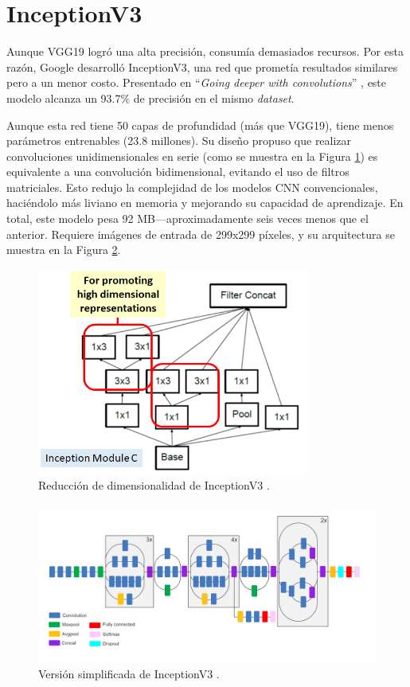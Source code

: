 \section{InceptionV3} \label{sec:inceptionV3}
Aunque VGG19 logró una alta precisión, consumía demasiados
recursos. Por esta razón, Google desarrolló InceptionV3, una
red que prometía resultados similares pero a un menor costo.
Presentado en ``\textit{Going deeper with convolutions}''
\cite{Szegedy2014}, este modelo alcanza un 93.7\% de precisión
en el mismo \textit{dataset}.\

Aunque esta red tiene 50 capas de profundidad (más que VGG19),
tiene menos parámetros entrenables (23.8 millones). Su diseño
propuso que realizar convoluciones unidimensionales en serie
(como se muestra en la Figura \ref{InceptionLayer}) es
equivalente a una convolución bidimensional, evitando el uso
de filtros matriciales. Esto redujo la complejidad de los
modelos CNN convencionales, haciéndolo más liviano en memoria
y mejorando su capacidad de aprendizaje. En total, este modelo
pesa 92 MB—aproximadamente seis veces menos que el anterior.
Requiere imágenes de entrada de 299x299 píxeles, y su
arquitectura se muestra en la Figura \ref{Inceptionv3}.


\begin{figure}[h!] 
    \includegraphics[width=0.8\textwidth]{images/InceptionLayer.png} 
    \centering 
    \caption{Reducción de dimensionalidad de InceptionV3 \protect\cite{modelos}.} 
    \label{InceptionLayer} 
\end{figure}

\begin{figure}[h!] 
    \includegraphics[width=1\textwidth]{images/InceptionV3.png} 
    \centering 
    \caption{Versión simplificada de InceptionV3 \protect\cite{modelos}.} 
    \label{Inceptionv3} 
\end{figure}

